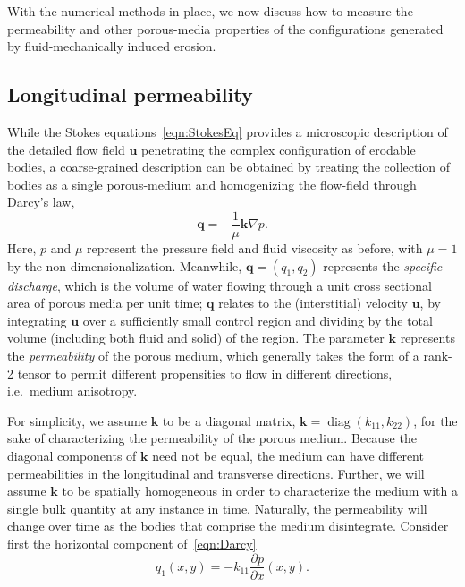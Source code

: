 \documentclass[3p]{elsarticle}
\newcommand{\grad}{{\nabla}}
\newcommand{\uu}{{\mathbf{u}}}
\newcommand{\pderiv}[2]{\frac{\partial #1}{\partial #2}}
\newcommand{\bvec}[1]{\mathbf{#1}}
\newcommand {\bq} {\bvec{q}}
\newcommand{\diag}{\mathop{\mathrm{diag}}}
\begin{document}
With the numerical methods in place, we now discuss how to measure the permeability and other porous-media properties of the configurations generated by fluid-mechanically induced erosion.

\subsection{Longitudinal permeability}
\label{LongPerm}

While the Stokes equations~\eqref{eqn:StokesEq} provides a microscopic description of the detailed flow field $\uu$ penetrating the complex configuration of erodable bodies, a coarse-grained description can be obtained by treating the collection of bodies as a single porous-medium and homogenizing the flow-field through Darcy's law,
\begin{equation}
  \label{eqn:Darcy}
  \bq = - \frac{1}{\mu} \bvec{k} \grad p.
\end{equation}
Here, $p$ and $\mu$ represent the pressure field and fluid viscosity as before, with $\mu = 1$ by the non-dimensionalization. Meanwhile, $\bq = (q_1, q_2)$ represents the {\em specific discharge}, which is the volume of water flowing through a unit cross sectional area of porous media per unit time; $\bq$ relates to the (interstitial) velocity $\uu$, by integrating $\uu$ over a sufficiently small control region and dividing by the total volume (including both fluid and solid) of the region. The parameter $\bvec{k}$ represents the {\em permeability} of the porous medium, which generally takes the form of a rank-2 tensor to permit different propensities to flow in different directions, i.e.~medium anisotropy.  


For simplicity, we assume $\bvec{k}$ to be a diagonal matrix, $\bvec{k}
= \diag(k_{11}, k_{22})$, for the sake of characterizing the
permeability of the porous medium. Because the diagonal components of
$\bvec{k}$ need not be equal, the medium can have different
permeabilities in the longitudinal and transverse directions. Further,
we will assume $\bvec{k}$ to be spatially homogeneous in order to
characterize the medium with a single bulk quantity at any instance in
time. Naturally, the permeability will change over time as the bodies
that comprise the medium disintegrate. Consider first the horizontal
component of~\eqref{eqn:Darcy}
\begin{equation}
  \label{q1}
  q_1(x,y) = -k_{11} \pderiv{p}{x}(x,y).
\end{equation}
\end{document}
